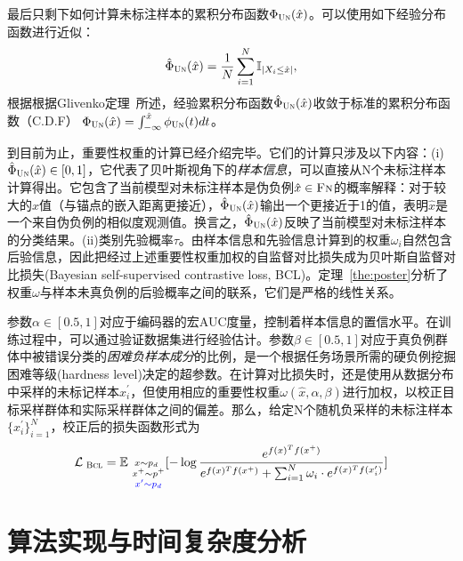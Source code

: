 最后只剩下如何计算未标注样本的累积分布函数$\Phi_{\textsc{Un}}(\hat{x})$。可以使用如下经验分布函数进行近似：
\begin{equation}\label{eq:puedf}
	\hat \Phi_{\textsc{Un}} (\hat{x}) = \frac{1}{N} \sum_{i=1}^{N}\mathbb{I}_{|X_i \leq \hat{x}|},
\end{equation}
根据根据Glivenko定理~\cite{glivenko:1933}所述，经验累积分布函数$\hat{\Phi}_{\textsc{Un}}(\hat{x})$收敛于标准的累积分布函数（C.D.F） $\Phi_{\textsc{Un}}(\hat{x}) = \int_{-\infty}^{\hat{x}} \phi_{\textsc{Un}}(t)dt$。


到目前为止，重要性权重的计算已经介绍完毕。它们的计算只涉及以下内容：(i) $\hat{\Phi}_{\textsc{Un}} (\hat{x}) \in [0,1]$，它代表了贝叶斯视角下的\textit{样本信息}，可以直接从N个未标注样本计算得出。它包含了当前模型对未标注样本是伪负例$\hat x \in \textsc{Fn}$的概率解释：对于较大的$\hat{x}$值（与锚点的嵌入距离更接近），$\hat{\Phi}_{\textsc{Un}} (\hat{x})$输出一个更接近于1的值，表明$\hat{x}$是一个来自伪负例的相似度观测值。换言之，$\hat{\Phi}_{\textsc{Un}} (\hat{x})$反映了当前模型对未标注样本的分类结果。(ii)类别先验概率$\tau$。由样本信息和先验信息计算到的权重$\omega_i$自然包含后验信息，因此把经过上述重要性权重加权的自监督对比损失成为贝叶斯自监督对比损失(Bayesian self-supervised contrastive loss, BCL)。定理~\ref{the:poster}分析了权重$\omega$与样本未真负例的后验概率之间的联系，它们是严格的线性关系。


参数$\alpha\in [0.5,1]$对应于编码器的宏AUC度量，控制着样本信息的置信水平。在训练过程中，可以通过验证数据集进行经验估计。参数$\beta\in [0.5,1]$对应于真负例群体中被错误分类的\textit{困难负样本成分}的比例，是一个根据任务场景所需的硬负例挖掘困难等级(hardness level)决定的超参数。在计算对比损失时，还是使用从数据分布中采样的未标记样本$x_i^\prime$，但使用相应的重要性权重$\omega(\hat{x},\alpha, \beta)$进行加权，以校正目标采样群体和实际采样群体之间的偏差。那么，给定N个随机负采样的未标注样本$\{x_i^\prime\}_{i=1}^N$，校正后的损失函数形式为
\begin{eqnarray}\label{eq:bcl}
	\mathcal{L}_\textsc{~Bcl}=  \mathbb E_{\substack{x \sim p_d\\~x^+ \sim p^+\\\color{blue}{~x^\prime \sim p_d}}} [-\log \frac{e^{f(x)^Tf(x^+)}}{e^{f(x)^Tf(x^+)} +  \sum_{i=1}^N  \omega_i \cdot e^{f(x)^Tf(x^\prime_i)} }]
\end{eqnarray}

\section{算法实现与时间复杂度分析}
